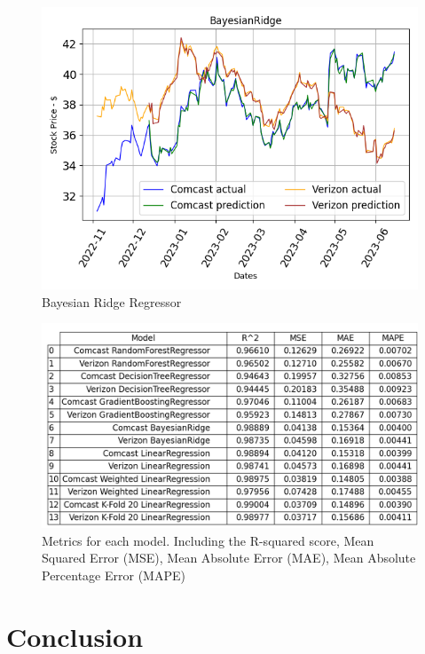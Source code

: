 \documentclass[conference]{IEEEtran}
\begin{document}
\begin{figure}
    \includegraphics[width=\columnwidth]{BayesianRidge}
    \caption{Bayesian Ridge Regressor}
    \label{fig:bay_ridge}
\end{figure}

\begin{figure}
    \includegraphics[width=\columnwidth]{metrics}
    \caption{Metrics for each model. Including the R-squared score, Mean Squared Error (MSE),
    Mean Absolute Error (MAE), Mean Absolute Percentage Error (MAPE)}
    \label{fig:metrics}
\end{figure}


\section{Conclusion}
\end{document}
